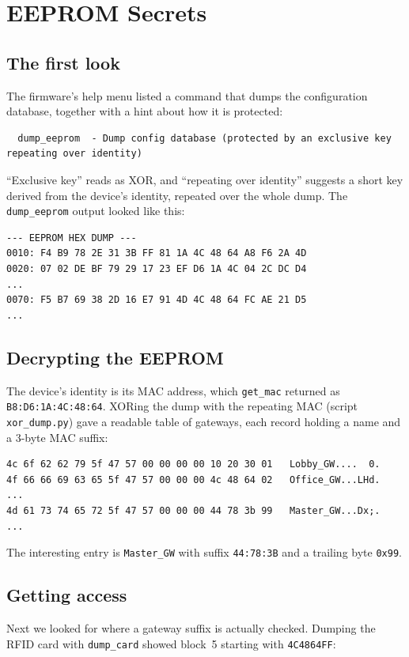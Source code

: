 \section{EEPROM Secrets}\label{section:EEPROMSecrets}

\subsection{The first look}
The firmware's help menu listed a command that dumps the configuration database, together with a hint about how it is protected:

\begin{lstlisting}
  dump_eeprom  - Dump config database (protected by an exclusive key repeating over identity)
\end{lstlisting}

``Exclusive key'' reads as XOR, and ``repeating over identity'' suggests a short key derived from the device's identity, repeated over the whole dump. The \texttt{dump\_eeprom} output looked like this:

\begin{lstlisting}[basicstyle=\ttfamily\scriptsize]
--- EEPROM HEX DUMP ---
0010: F4 B9 78 2E 31 3B FF 81 1A 4C 48 64 A8 F6 2A 4D
0020: 07 02 DE BF 79 29 17 23 EF D6 1A 4C 04 2C DC D4
...
0070: F5 B7 69 38 2D 16 E7 91 4D 4C 48 64 FC AE 21 D5
...
\end{lstlisting}

\subsection{Decrypting the EEPROM}
The device's identity is its MAC address, which \texttt{get\_mac} returned as \texttt{B8:D6:1A:4C:48:64}. XORing the dump with the repeating MAC (script \texttt{xor\_dump.py}) gave a readable table of gateways, each record holding a name and a 3-byte MAC suffix:

\begin{lstlisting}[basicstyle=\ttfamily\scriptsize]
4c 6f 62 62 79 5f 47 57 00 00 00 00 10 20 30 01   Lobby_GW....  0.
4f 66 66 69 63 65 5f 47 57 00 00 00 4c 48 64 02   Office_GW...LHd.
...
4d 61 73 74 65 72 5f 47 57 00 00 00 44 78 3b 99   Master_GW...Dx;.
...
\end{lstlisting}

The interesting entry is \texttt{Master\_GW} with suffix \texttt{44:78:3B} and a trailing byte \texttt{0x99}.

\subsection{Getting access}
Next we looked for where a gateway suffix is actually checked. Dumping the RFID card with \texttt{dump\_card} showed block~5 starting with \texttt{4C4864FF}:

